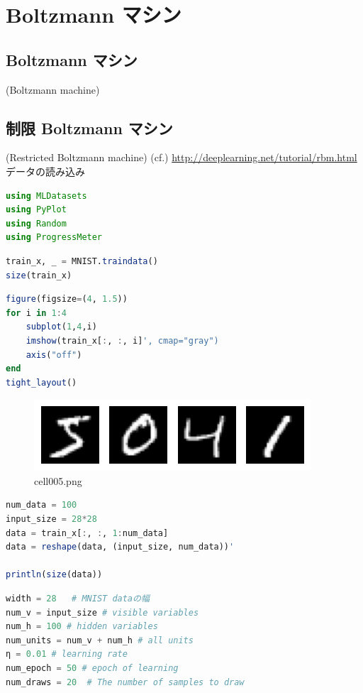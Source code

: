 \section{Boltzmann マシン}
\subsection{Boltzmann マシン}
(Boltzmann machine)
\subsection{制限 Boltzmann マシン}
(Restricted Boltzmann machine) 
(cf.) \url{http://deeplearning.net/tutorial/rbm.html}
データの読み込み
\begin{lstlisting}[language=julia]
using MLDatasets
using PyPlot
using Random
using ProgressMeter
\end{lstlisting}
\begin{lstlisting}[language=julia]
train_x, _ = MNIST.traindata()
size(train_x)
\end{lstlisting}
\begin{lstlisting}[language=julia]
figure(figsize=(4, 1.5))
for i in 1:4
    subplot(1,4,i)
    imshow(train_x[:, :, i]', cmap="gray")
    axis("off")
end
tight_layout()
\end{lstlisting}
\begin{figure}[ht]
	\centering
	\includegraphics[scale=0.8, max width=\linewidth]{./fig/energy-based-model/boltzmann-machine/cell005.png}
	\caption{cell005.png}
	\label{cell005.png}
\end{figure}
\begin{lstlisting}[language=julia]
num_data = 100
input_size = 28*28
data = train_x[:, :, 1:num_data]
data = reshape(data, (input_size, num_data))'

println(size(data))
\end{lstlisting}
\begin{lstlisting}[language=julia]
width = 28   # MNIST dataの幅
num_v = input_size # visible variables
num_h = 100 # hidden variables
num_units = num_v + num_h # all units
η = 0.01 # learning rate
num_epoch = 50 # epoch of learning 
num_draws = 20  # The number of samples to draw
\end{lstlisting}
